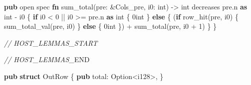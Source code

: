 \documentclass[
  10pt,
]{article}
\newenvironment{Shaded}{}{}
\newcommand{\CommentTok}[1]{\textcolor[rgb]{0.38,0.63,0.69}{\textit{#1}}}
\newcommand{\ControlFlowTok}[1]{\textcolor[rgb]{0.00,0.44,0.13}{\textbf{#1}}}
\newcommand{\DataTypeTok}[1]{\textcolor[rgb]{0.56,0.13,0.00}{#1}}
\newcommand{\DecValTok}[1]{\textcolor[rgb]{0.25,0.63,0.44}{#1}}
\newcommand{\KeywordTok}[1]{\textcolor[rgb]{0.00,0.44,0.13}{\textbf{#1}}}
\newcommand{\NormalTok}[1]{#1}
\newcommand{\OperatorTok}[1]{\textcolor[rgb]{0.40,0.40,0.40}{#1}}
\newcommand{\RegionMarkerTok}[1]{#1}
\begin{document}
\begin{Shaded}
\begin{Highlighting}[]
\KeywordTok{pub}\NormalTok{ open spec }\KeywordTok{fn}\NormalTok{ sum\_total(pre}\OperatorTok{:} \OperatorTok{\&}\NormalTok{Cols\_pre}\OperatorTok{,}\NormalTok{ i0}\OperatorTok{:}\NormalTok{ int) }\OperatorTok{{-}\textgreater{}}\NormalTok{ int}
\NormalTok{    decreases pre}\OperatorTok{.}\NormalTok{n }\KeywordTok{as}\NormalTok{ int }\OperatorTok{{-}}\NormalTok{ i0}
\OperatorTok{\{}
    \ControlFlowTok{if}\NormalTok{ i0 }\OperatorTok{\textless{}} \DecValTok{0} \OperatorTok{||}\NormalTok{ i0 }\OperatorTok{\textgreater{}=}\NormalTok{ pre}\OperatorTok{.}\NormalTok{n }\KeywordTok{as}\NormalTok{ int }\OperatorTok{\{}
\NormalTok{        0int}
    \OperatorTok{\}} \ControlFlowTok{else} \OperatorTok{\{}
\NormalTok{        (}\ControlFlowTok{if}\NormalTok{ row\_hit(pre}\OperatorTok{,}\NormalTok{ i0) }\OperatorTok{\{}\NormalTok{ sum\_total\_val(pre}\OperatorTok{,}\NormalTok{ i0) }\OperatorTok{\}} \ControlFlowTok{else} \OperatorTok{\{}\NormalTok{ 0int }\OperatorTok{\}}\NormalTok{) }\OperatorTok{+}\NormalTok{ sum\_total(pre}\OperatorTok{,}\NormalTok{ i0 }\OperatorTok{+} \DecValTok{1}\NormalTok{)}
    \OperatorTok{\}}
\OperatorTok{\}}

\CommentTok{// HOST\_LEMMAS\_START}

\CommentTok{// HOST\_LEMMAS\_}\RegionMarkerTok{END}

\KeywordTok{pub} \KeywordTok{struct}\NormalTok{ OutRow }\OperatorTok{\{}
    \KeywordTok{pub}\NormalTok{ total}\OperatorTok{:} \DataTypeTok{Option}\OperatorTok{\textless{}}\DataTypeTok{i128}\OperatorTok{\textgreater{},}
\OperatorTok{\}}


\end{Highlighting}
\end{Shaded}
\end{document}
